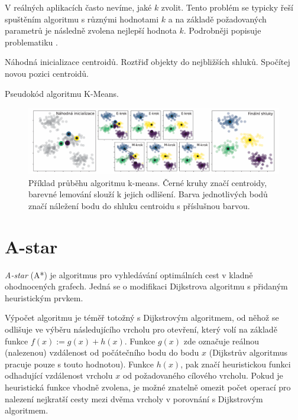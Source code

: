V reálných aplikacích často nevíme, jaké $k$ zvolit. Tento problém se typicky 
řeší spuštěním algoritmu s různými hodnotami $k$ a na základě požadovaných
parametrů je následně zvolena nejlepší hodnota $k$. Podrobněji popisuje 
problematiku \citet{macqueen1967classification}.

\begin{algorithm}
\begin{algorithmic}
    \State Náhodná inicializace centroidů.
        \State Roztřiď objekty do nejbližších shluků.
        \State Spočítej novou pozici centroidů.
    \EndWhile

\EndFunction
\end{algorithmic}
\caption{Pseudokód algoritmu K-Means.}
\label{alg:kmeans_alg}
\end{algorithm}


\begin{figure}
    \centering
    \includegraphics[width=1\linewidth]{img/pdfa-kmeans_example.pdf}
    \caption{Příklad průběhu algoritmu k-means. Černé kruhy značí centroidy, 
    barevné lemování slouží k jejich odlišení. Barva jednotlivých bodů
    značí náležení bodu do shluku centroidu s příslušnou barvou.}
    \label{fig:kmeans_example}
\end{figure}


\section{A-star}
\label{sec:a_star}
\emph{A-star} (A*) je algoritmus pro vyhledávání optimálních cest v kladně 
ohodnocených grafech. Jedná se o modifikaci Dijkstrova algoritmu s přidaným 
heuristickým prvkem.

Výpočet algoritmu je téměř totožný s Dijkstrovým algoritmem, od něhož se 
odlišuje ve výběru následujícího vrcholu pro otevření, který volí na základě
funkce $f(x) := g(x) + h(x)$. Funkce $g(x)$ zde označuje reálnou (nalezenou) 
vzdálenost od počátečního bodu do bodu $x$ (Dijkstrův algoritmus pracuje pouze 
s touto hodnotou). Funkce $h(x)$, pak značí heuristickou funkci odhadující 
vzdálenost vrcholu $x$ od požadovaného cílového vrcholu. Pokud je heuristická 
funkce vhodně zvolena, je možné znatelně omezit počet operací pro nalezení nejkratší
cesty mezi dvěma vrcholy v porovnání s Dijkstrovým algoritmem. 

